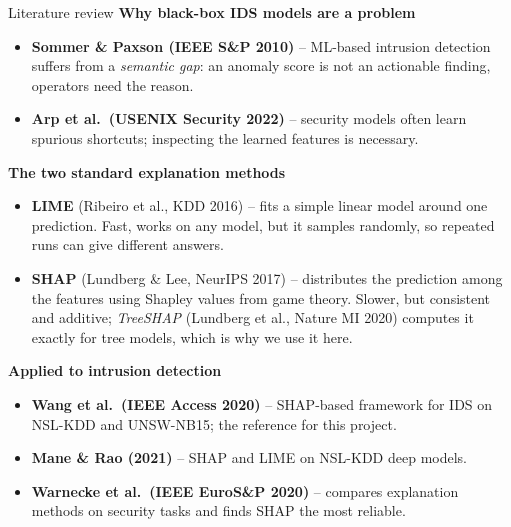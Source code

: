 \documentclass[11pt,aspectratio=169]{beamer}
\begin{document}
\begin{frame}{Literature review}
\footnotesize
\textbf{Why black-box IDS models are a problem}
\begin{itemize}\itemsep1pt
  \item \textbf{Sommer \& Paxson (IEEE S\&P 2010)} -- ML-based intrusion
        detection suffers from a \emph{semantic gap}: an anomaly score is not an
        actionable finding, operators need the reason.
  \item \textbf{Arp et al.\ (USENIX Security 2022)} -- security models often learn
        spurious shortcuts; inspecting the learned features is necessary.
\end{itemize}

\vspace{0.6em}
\textbf{The two standard explanation methods}
\begin{itemize}\itemsep1pt
  \item \textbf{LIME} (Ribeiro et al., KDD 2016) -- fits a simple linear model
        around one prediction. Fast, works on any model, but it samples randomly,
        so repeated runs can give different answers.
  \item \textbf{SHAP} (Lundberg \& Lee, NeurIPS 2017) -- distributes the
        prediction among the features using Shapley values from game theory.
        Slower, but consistent and additive; \emph{TreeSHAP}
        (Lundberg et al., Nature MI 2020) computes it exactly for tree models,
        which is why we use it here.
\end{itemize}

\vspace{0.6em}
\textbf{Applied to intrusion detection}
\begin{itemize}\itemsep1pt
  \item \textbf{Wang et al.\ (IEEE Access 2020)} -- SHAP-based framework for IDS
        on NSL-KDD and UNSW-NB15; the reference for this project.
  \item \textbf{Mane \& Rao (2021)} -- SHAP and LIME on NSL-KDD deep models.
  \item \textbf{Warnecke et al.\ (IEEE EuroS\&P 2020)} -- compares explanation
        methods on security tasks and finds SHAP the most reliable.
\end{itemize}
\end{frame}
\end{document}
